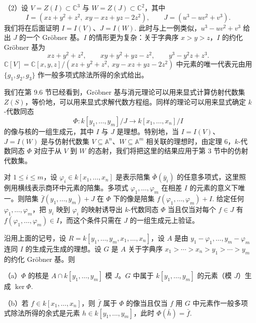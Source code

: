 （2）设 \(V = Z(I) \subset \mathbb{C}^3\) 与 \(W = Z(J) \subset \mathbb{C}^2\)，其中
\[
I = (xz+y^2+z^2,\ xy-xz+yz-2z^2), \qquad J = (u^3-uv^2+v^3).
\]
我们将在后面证明 \(I = I(V)\)、\(J = I(W)\). 此时与上一例类似，\(u^3-uv^2+v^3\) 给出 \(J\) 的一个 Gröbner 基。\(I\) 的情形更为复杂：关于字典序 \(x > y > z\)，\(I\) 的约化 Gröbner 基为
\[
xz+y^2+z^2, \qquad xy+y^2+yz-z^2, \qquad y^3-y^2z+z^3.
\]
\(\mathbb{C}[V] = \mathbb{C}[x,y,z]/(xz+y^2+z^2,\ xy-xz+yz-2z^2)\) 中元素的唯一代表元由用 \(\{g_1, g_2, g_3\}\) 作一般多项式除法所得的余式给出。

我们在第 9.6 节已经看到，Gröbner 基与消元理论可以用来显式计算仿射代数集 \(Z(S)\)，等价地，可以用来显式求解代数方程组。同样的理论可以用来显式确定 \(k\)-代数同态
\[
\Phi : k[y_1, \ldots, y_m]/J \to k[x_1, \ldots, x_n]/I
\]
的像与核的一组生成元，其中 \(I\) 与 \(J\) 是理想。特别地，当 \(I = I(V)\)、\(J = I(W)\) 是与仿射代数集 \(V \subseteq \mathbb{A}^n\)、\(W \subseteq \mathbb{A}^m\) 相关联的理想时，由定理 6，\(k\)-代数同态 \(\Phi\) 对应于从 \(V\) 到 \(W\) 的态射，我们将把这里的结果应用于第 3 节中的仿射代数集。

对 \(1 \leq i \leq m\)，设 \(\varphi_i \in k[x_1, \ldots, x_n]\) 是表示陪集 \(\bar\Phi(\bar y_i)\) 的任意多项式，这里照例用横线表示商环中元素的陪集。多项式 \(\varphi_1, \ldots, \varphi_m\) 在相差 \(I\) 的元素的意义下唯一。则陪集 \(\bar f(y_1, \ldots, y_m)+J\) 在 \(\Phi\) 下的像是陪集 \(f(\varphi_1, \ldots, \varphi_m)+I\). 给定任何 \(\varphi_1, \ldots, \varphi_m\)，把 \(y_i\) 映到 \(\varphi_i\) 的映射诱导出 \(k\)-代数同态 \(\Phi\) 当且仅当对每个 \(f \in J\) 有 \(f(\varphi_1, \ldots, \varphi_m) \in I\)，而这个条件只需在 \(J\) 的一组生成元上验证。

\begin{proposition}\label{pro:15.8}
沿用上面的记号，设 \(R = k[y_1, \ldots, y_m, x_1, \ldots, x_n]\)，设 \(A\) 是由 \(y_1-\varphi_1, \ldots, y_m-\varphi_m\) 连同 \(I\) 的生成元生成的理想。设 \(G\) 是 \(A\) 关于字典序 \(x_1 > \cdots > x_n > y_1 > \cdots > y_m\) 的约化 Gröbner 基。则

（a）\(\Phi\) 的核是 \(A \cap k[y_1, \ldots, y_m]\) 模 \(J\)。\(G\) 中属于 \(k[y_1, \ldots, y_m]\) 的元素（模 \(J\)）生成 \(\ker\Phi\).

（b）若 \(f \in k[x_1, \ldots, x_n]\)，则 \(\bar f\) 属于 \(\Phi\) 的像当且仅当 \(f\) 用 \(G\) 中元素作一般多项式除法所得的余式是元素 \(h \in k[y_1, \ldots, y_m]\)，此时 \(\Phi(\bar h) = \bar f\).
\end{proposition}

